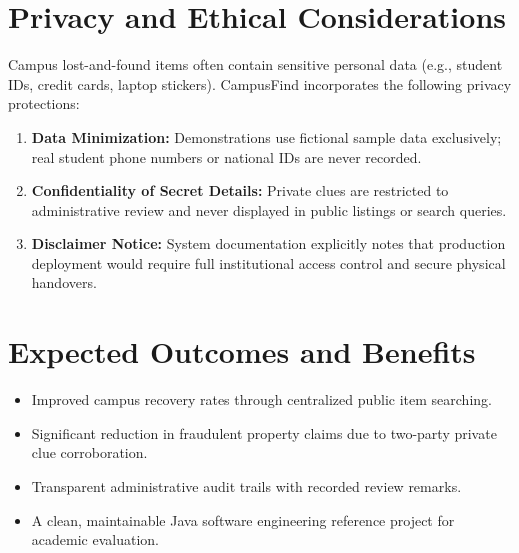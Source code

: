 \documentclass[11pt,a4paper]{article}
\begin{document}
\section{Privacy and Ethical Considerations}
Campus lost-and-found items often contain sensitive personal data (e.g., student IDs, credit cards, laptop stickers). CampusFind incorporates the following privacy protections:
\begin{enumerate}
    \item \textbf{Data Minimization:} Demonstrations use fictional sample data exclusively; real student phone numbers or national IDs are never recorded.
    \item \textbf{Confidentiality of Secret Details:} Private clues are restricted to administrative review and never displayed in public listings or search queries.
    \item \textbf{Disclaimer Notice:} System documentation explicitly notes that production deployment would require full institutional access control and secure physical handovers.
\end{enumerate}

\section{Expected Outcomes and Benefits}
\begin{itemize}
    \item Improved campus recovery rates through centralized public item searching.
    \item Significant reduction in fraudulent property claims due to two-party private clue corroboration.
    \item Transparent administrative audit trails with recorded review remarks.
    \item A clean, maintainable Java software engineering reference project for academic evaluation.
\end{itemize}

\end{document}
